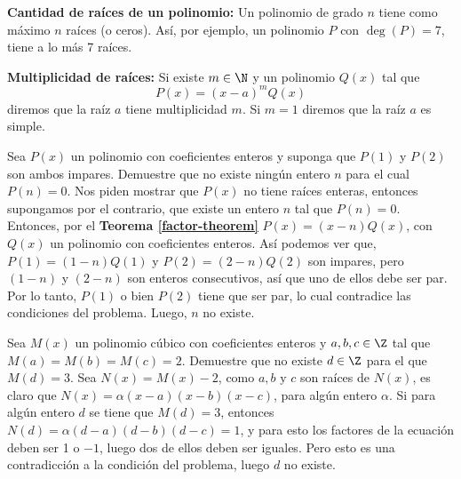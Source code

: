 {    \textbf{Cantidad de raíces de un polinomio:} Un polinomio de grado $n$ tiene como máximo $n$ raíces (o ceros). Así, por ejemplo, un polinomio $P$ con $\deg{(P)} = 7$, tiene a lo más 7 raíces.

    \textbf{Multiplicidad de raíces:} Si existe $m \in \N$ y un polinomio $Q(x)$ tal que \[P(x) = (x - a)^m Q(x)\] diremos que la raíz $a$ tiene multiplicidad $m$. Si $m = 1$ diremos que la raíz $a$ es simple.

    \begin{example}
        Sea $P(x)$ un polinomio con coeficientes enteros y suponga que $P(1)$ y $P(2)$ son ambos impares. Demuestre que no existe ningún entero $n$ para el cual $P(n) = 0$.
        \exampleProof
        {
            Nos piden mostrar que $P(x)$ no tiene raíces enteras, entonces supongamos por el contrario, que existe un entero $n$ tal que $P(n) = 0$. Entonces, por el \textbf{Teorema \ref{factor-theorem}} $P(x) = (x - n)Q(x)$, con $Q(x)$ un polinomio con coeficientes enteros. Así podemos ver que, $P(1) = (1 - n)Q(1)$ y $P(2) = (2 - n)Q(2)$ son impares, pero $(1 - n)$ y $(2 - n)$ son enteros consecutivos, así que uno de ellos debe ser par. Por lo tanto, $P(1)$ o bien $P(2)$ tiene que ser par, lo cual contradice las condiciones del problema. Luego, $n$ no existe.
        }
    \end{example}

    \begin{example}
        Sea $M(x)$ un polinomio cúbico con coeficientes enteros y $a, b, c \in \Z$ tal que $M(a) = M(b) = M(c) = 2$. Demuestre que no existe $d \in \Z$ para el que $M(d) = 3.$
        \exampleProof
        {
            Sea $N(x) = M(x) - 2$, como $a, b \mbox{ y } c$ son raíces de $N(x)$, es claro que $N(x) = \alpha (x - a)(x - b)(x - c)$, para algún entero $\alpha$. Si para algún entero $d$ se tiene que $M(d) = 3$, entonces $N(d) = \alpha (d - a)(d - b)(d - c) = 1$, y para esto los factores de la ecuación deben ser 1 o $-1$, luego dos de ellos deben ser iguales. Pero esto es una contradicción a la condición del problema, luego $d$ no existe.
        }
    \end{example}
}
\label{subsec:definiciones}

